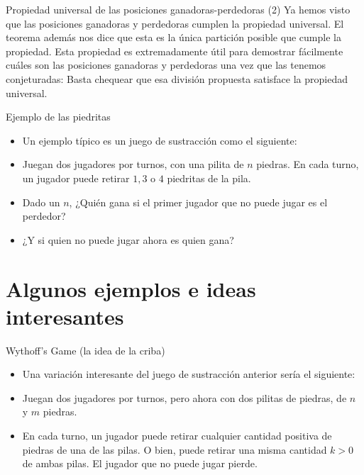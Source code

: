 \documentclass{beamer}
\begin{document}
\begin{frame}{Propiedad universal de las posiciones ganadoras-perdedoras (2)}
    Ya hemos visto que las posiciones ganadoras y perdedoras cumplen la propiedad universal. El teorema además nos dice que
  esta es la única partición posible que cumple la propiedad. Esta propiedad es extremadamente útil para demostrar fácilmente
  cuáles son las posiciones ganadoras y perdedoras una vez que las tenemos conjeturadas: Basta chequear que esa división propuesta
  satisface la propiedad universal.
\end{frame}

\begin{frame}{Ejemplo de las piedritas}
    \begin{itemize}
        \item Un ejemplo típico es un juego de sustracción como el siguiente:
        \item Juegan dos jugadores por turnos, con una pilita de $n$ piedras. En cada turno, un jugador puede retirar $1,3$ o $4$ piedritas de la pila.
        \item Dado un $n$, ¿Quién gana si el primer jugador que no puede jugar es el perdedor?
        \item ¿Y si quien no puede jugar ahora es quien gana?
    \end{itemize}  
\end{frame}

\section{Algunos ejemplos e ideas interesantes}

\begin{frame}{Wythoff's Game (la idea de la criba)}
    \begin{itemize}
        \item Una variación interesante del juego de sustracción anterior sería el siguiente:
        \item Juegan dos jugadores por turnos, pero ahora con dos pilitas de piedras, de $n$ y $m$ piedras.
        \item En cada turno, un jugador puede retirar cualquier cantidad positiva de piedras de una de las pilas. O bien, puede
        retirar una misma cantidad $k > 0$ de ambas pilas. El jugador que no puede jugar pierde.
    \end{itemize}
\end{frame}
\end{document}
